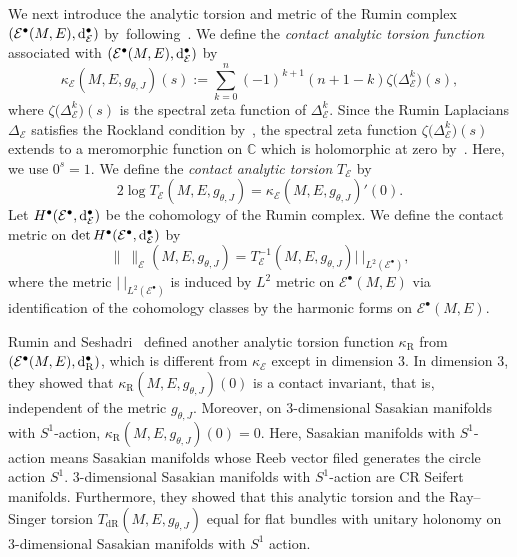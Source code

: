 \documentclass[10pt,a4paper]{amsart}
\numberwithin{equation}{section}
\newcommand{\deRham}{\mathrm{dR}}
\newcommand{\Rumin}{\mathrm{R}}
\newcommand{\RN}{\cE}
\newcommand{\cE}{\mathcal{E}}
\begin{document}
We next introduce the analytic torsion and metric of the Rumin complex $(\cE ^\bullet (M,E) , {\rm d}_\RN ^\bullet)$ by~following~\cite{Bismut-Zhang-92, Kitaoka-19, Rumin-Seshadri-12}.
We define the {\em contact analytic torsion function} associated with $(\cE ^\bullet (M,E),\allowbreak {\rm d}_\RN ^\bullet)$ by
\begin{equation}
 \label{kappa}
 \kappa_\RN ( M, E, g_{\theta , J}) (s)
 := \sum_{k=0}^{n} (-1)^{k+1} (n+1-k) \zeta \big(\Delta_\RN ^k \big) (s)
 ,
\end{equation}
where $\zeta \big(\Delta_\RN ^k \big) (s)$ is the spectral zeta function of $\Delta_\RN ^k$.
Since the Rumin Laplacians $\Delta_\RN $ satisfies the Rockland condition by~\cite[p.~300]{Rumin-94},
the spectral zeta function $\zeta \big(\Delta_\RN ^k \big) (s)$ extends to a meromorphic function
on $\mathbb{C}$ which is holomorphic at zero by~\cite[Section~4]{Ponge-07}.
Here, we use $0^s = 1$.
We define the {\em contact analytic torsion} $ T_\RN $ by
\[
 2 \log T_\RN ( M , E, g_{\theta , J})
 =
 \kappa_\RN ( M , E, g_{\theta , J}) ' (0) .
\]
Let $H^\bullet (\cE ^\bullet , {\rm d}_\RN ^\bullet)$ be the cohomology of the Rumin complex.
We define the contact metric on $\det H^\bullet (\cE ^\bullet , {\rm d}_\RN ^\bullet)$ by
\[
 \| \ \|_\RN (M, E, g_{\theta , J} )
 =
 T_\RN^{-1} ( M , E, g_{\theta , J})
 | \ |_{L^2 (\cE ^\bullet) },
\]
where
the metric
$| \ |_{L^2 (\cE ^\bullet) }$ is induced by $L^2$ metric on $\cE ^\bullet (M, E)$
via identification of the cohomology classes by the harmonic forms on $\cE ^\bullet (M, E)$.


Rumin and Seshadri~\cite{Rumin-Seshadri-12} defined another analytic torsion function $\kappa_{\Rumin}$ from
$(\cE ^\bullet (M,E) , {\rm d}_{\Rumin }^\bullet )$, which is different from $\kappa_\RN $ except in dimension 3.
In dimension 3, they showed that
$\kappa_{\Rumin} (M, E, \allowbreak g_{\theta , J} ) (0)$ is a contact invariant,
that is, independent of the metric $g_{\theta , J}$.
Moreover, on 3-dimensional Sasakian manifolds with $S^1$-action, $\kappa_{\Rumin} (M, E, g_{\theta , J} ) (0) = 0 $.
Here,
Sasakian manifolds with $S^1$-action means Sasakian manifolds whose Reeb vector filed generates the circle action $S^1$.
3-di\-men\-sional Sasakian manifolds with $S^1$-action
are CR Seifert manifolds.
Furthermore, they showed that this analytic torsion and the Ray--Singer torsion $T_{\deRham } (M, E, g_{\theta , J} )$ equal for flat bundles with unitary holonomy on 3-dimensional Sasakian manifolds with $S^1$ action.
\end{document}

